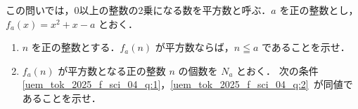 ﻿\documentclass[../../../uem_tok_q.tex]{subfiles}
\begin{document}
    この問いでは，0以上の整数の2乗になる数を平方数と呼ぶ．$a$ を正の整数とし，%
    $f_a(x)=x^2+x-a$ とおく．

    \begin{enumerate}
        \item $n$ を正の整数とする．$f_a(n)$ が平方数ならば，$n\leqq a$ であることを示せ．
        \item $f_a(n)$ が平方数となる正の整数 $n$ の個数を $N_a$ とおく．%
            次の条件\,\ref{uem_tok_2025_f_sci_04_q:1}，\ref{uem_tok_2025_f_sci_04_q:2}\,%
            が同値であることを示せ．
            
    \end{enumerate}
\end{document}

